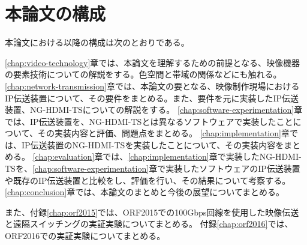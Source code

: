 \section{本論文の構成}
本論文における以降の構成は次のとおりである。

\ref{chap:video-technology}章では、本論文を理解するための前提となる、映像機器の要素技術についての解説をする。色空間と帯域の関係などにも触れる。
\ref{chap:network-transmission}章では、本論文の要となる、映像制作現場におけるIP伝送装置について、その要件をまとめる。また、要件を元に実装したIP伝送装置、NG-HDMI-TSについての解説をする。
\ref{chap:software-experimentation}章では、IP伝送装置を、NG-HDMI-TSとは異なるソフトウェアで実装したことについて、その実装内容と評価、問題点をまとめる。
\ref{chap:implementation}章では、IP伝送装置のNG-HDMI-TSを実装したことについて、その実装内容をまとめる。
\ref{chap:evaluation}章では、\ref{chap:implementation}章で実装したNG-HDMI-TSを、\ref{chap:software-experimentation}章で実装したソフトウェアのIP伝送装置や既存のIP伝送装置と比較をし、評価を行い、その結果について考察する。
\ref{chap:conclusion}章では、本論文のまとめと今後の展望についてまとめる。

また、付録\ref{chap:orf2015}では、ORF2015での100Gbps回線を使用した映像伝送と遠隔スイッチングの実証実験についてまとめる。
付録\ref{chap:orf2016}では、ORF2016での実証実験についてまとめる。
